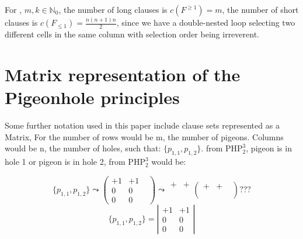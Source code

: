 \documentclass{report}
\newcommand{\set}[1]{\{ #1 \}}
\newcommand{\NN}{\mathbb{N}}
\newcommand{\NNZ}{\NN_0}
\newcommand{\php}{\mathrm{PHP}}
\begin{document}
For \bmm{\php^m_k}, $m, k \in \NNZ$, the number of long clauses is $c(F^{\ge 1}) = m$, the number of short clauses is $c(F_{\le 1}) = \frac {n(n+1)n}{2}$, since we have a double-nested loop selecting two different cells in the same column with selection order being irreverent.


\section{Matrix representation of the Pigeonhole principles}
\label{sec:phpMatrix}

Some further notation used in this paper include clause sets represented as a Matrix,
For \bmm{\php^m_k} the number of rows would be m, the number of pigeons.
Columns would be n, the number of holes, such that: $\set{p_{1,1},p_{1,2}}.$ from $\php^3_2$,  pigeon is in hole 1 or pigeon is in hole 2, from $\php^3_2$ would be:

\begin{displaymath}
  \set{p_{1,1},p_{1,2}} \leadsto
  \begin{pmatrix}
    +1 & +1\\
    0 & 0 &\\
    0 & 0
  \end{pmatrix} \leadsto
  \begin{array}{cc}
    + & +\\
    \\
    \\
  \end{array}
  \begin{pmatrix}
    + & +&\\
     &  &\\
     &  &
  \end{pmatrix} ???
\end{displaymath}
\[ \set{p_{1,1},p_{1,2}} = \left| \begin{array}{ccc}
+1 & +1 \\
 0 & 0 \\
 0 & 0 \end{array} \right| \] 
 
\end{document}
